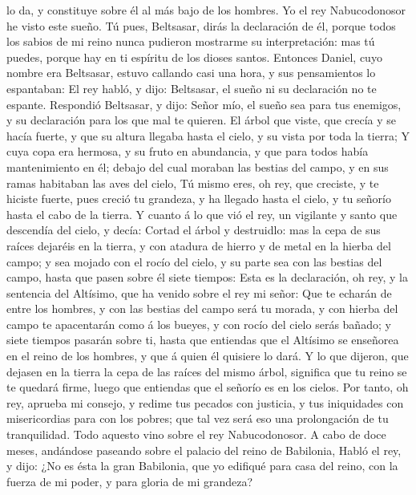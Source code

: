 lo da, y constituye sobre él al más bajo de los hombres. 
Yo el rey Nabucodonosor he visto este sueño. Tú pues, Beltsasar, dirás
la declaración de él, porque todos los sabios de mi reino nunca pudieron
mostrarme su interpretación: mas tú puedes, porque hay en ti espíritu de
los dioses santos.  Entonces Daniel, cuyo nombre era
Beltsasar, estuvo callando casi una hora, y sus pensamientos lo
espantaban: El rey habló, y dijo: Beltsasar, el sueño ni su declaración
no te espante. Respondió Beltsasar, y dijo: Señor mío, el sueño sea para
tus enemigos, y su declaración para los que mal te quieren.
 El árbol que viste, que crecía y se hacía fuerte, y que su
altura llegaba hasta el cielo, y su vista por toda la tierra;
 Y cuya copa era hermosa, y su fruto en abundancia, y que
para todos había mantenimiento en él; debajo del cual moraban las
bestias del campo, y en sus ramas habitaban las aves del cielo,
 Tú mismo eres, oh rey, que creciste, y te hiciste fuerte,
pues creció tu grandeza, y ha llegado hasta el cielo, y tu señorío hasta
el cabo de la tierra.  Y cuanto á lo que vió el rey, un
vigilante y santo que descendía del cielo, y decía: Cortad el árbol y
destruidlo: mas la cepa de sus raíces dejaréis en la tierra, y con
atadura de hierro y de metal en la hierba del campo; y sea mojado con el
rocío del cielo, y su parte sea con las bestias del campo, hasta que
pasen sobre él siete tiempos:  Esta es la declaración, oh
rey, y la sentencia del Altísimo, que ha venido sobre el rey mi señor:
 Que te echarán de entre los hombres, y con las bestias del
campo será tu morada, y con hierba del campo te apacentarán como á los
bueyes, y con rocío del cielo serás bañado; y siete tiempos pasarán
sobre ti, hasta que entiendas que el Altísimo se enseñorea en el reino
de los hombres, y que á quien él quisiere lo dará.  Y lo
que dijeron, que dejasen en la tierra la cepa de las raíces del mismo
árbol, significa que tu reino se te quedará firme, luego que entiendas
que el señorío es en los cielos.  Por tanto, oh rey,
aprueba mi consejo, y redime tus pecados con justicia, y tus iniquidades
con misericordias para con los pobres; que tal vez será eso una
prolongación de tu tranquilidad.  Todo aquesto vino sobre
el rey Nabucodonosor.  A cabo de doce meses, andándose
paseando sobre el palacio del reino de Babilonia,  Habló el
rey, y dijo: ¿No es ésta la gran Babilonia, que yo edifiqué para casa
del reino, con la fuerza de mi poder, y para gloria de mi grandeza?
